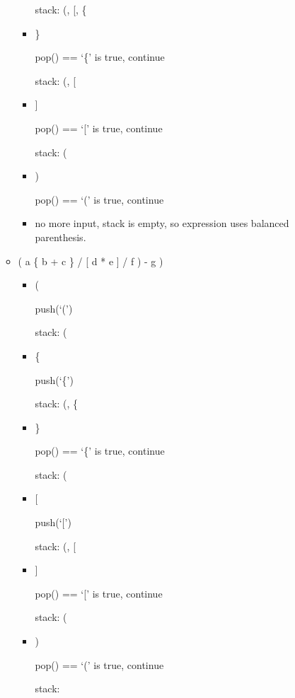 \documentclass[10pt]{article}
\begin{document}
\begin{enumerate}
\begin{itemize}
\begin{itemize}
							stack: (, {[}, \{
						
						\item \}
							
							pop() == `\{' is true, continue
							
							stack: (, {[}
						
						\item {]}
							
							pop() == `{[}' is true, continue
							
							stack: (
						
						\item )
							
							pop() == `(' is true, continue
						
						\item no more input, stack is empty, so expression uses balanced parenthesis.
					\end{itemize}
				
				\item ( a \{ b + c \} / [ d * e ] / f ) - g )
					
					\begin{itemize}
						\item (
							
							push(`(')
							
							stack: (
						
						\item \{
							
							push(`\{')
							
							stack: (, \{
						
						\item \}
							
							pop() == `\{' is true, continue
							
							stack: (
						
						\item {[}
							
							push(`{[}')
							
							stack: (, {[}
						
						\item {]}
							
							pop() == `{[}' is true, continue
							
							stack: (
						
						\item )
							
							pop() == `(' is true, continue
							
							stack:
						

\end{itemize}
\end{itemize}
\end{enumerate}
\end{document}
